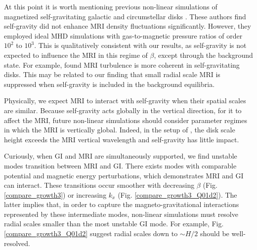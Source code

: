 At this point it is worth mentioning previous non-linear simulations 
of magnetized self-gravitating galactic and circumstellar disks
\citep{kim03,fromang04a,fromang04}. These authors find self-gravity
did not enhance MRI density fluctuations significantly. However, they
employed ideal MHD simulations with gas-to-magnetic pressure ratios of
order $10^2$ to $10^3$. %
This is qualitatively consistent with our results, as 
self-gravity is not expected to influence the MRI in this  
regime of $\beta$, except through the background state. 
For example, \cite{fromang04} found
MRI turbulence is more coherent in self-gravitating disks. This may be related
to our finding that small radial scale MRI is suppressed when
self-gravity is included in the background equilibria. 

Physically, we expect MRI to interact with self-gravity when
their spatial scales are similar. Because self-gravity acts globally in the
vertical direction, for it to affect the MRI, future non-linear
simulations should consider parameter regimes in which the MRI is
vertically global. %
Indeed, in the setup of \cite{kim03}, the disk
scale height exceeds the MRI vertical wavelength and self-gravity has
little impact.   



Curiously, when GI and MRI are simultaneously supported, we find
unstable modes transition between MRI and GI. There exists modes 
with comparable potential and magnetic energy perturbations, which 
demonstrates MRI and GI can interact. These 
transitions occur smoother with decreasing $\beta$
(Fig. \ref{compare_growth3}) or increasing $k_x$
(Fig. \ref{compare_growth3_Q01d2}). The latter implies that, in order
to capture the magneto-gravitational interactions represented by these
intermediate modes, non-linear simulations must resolve radial scales
smaller than the most unstable GI mode. For example, 
Fig. \ref{compare_growth3_Q01d2} suggest radial scales down to $\sim H/2$
should be well-resolved. 


